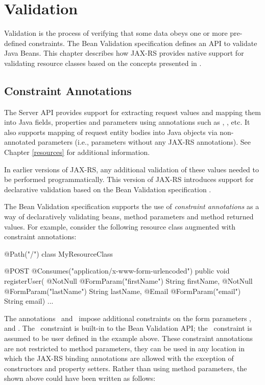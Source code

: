 \chapter{Validation}
\label{validation}

Validation is the process of verifying that some data obeys one or more pre-defined constraints. The Bean Validation specification \cite{bv11} defines an API to validate Java Beans. This chapter describes how JAX-RS provides native support for validating resource classes based on the concepts presented in \cite{bv11}.

\section{Constraint Annotations}
\label{constraint_annotations}

The Server API provides support for extracting request values and mapping them into Java fields, properties and parameters using annotations such as , , etc. It also supports mapping of request entity bodies into Java objects via non-annotated parameters (i.e., parameters without any JAX-RS annotations). See Chapter \ref{resources} for additional information.

In earlier versions of JAX-RS, any additional validation of these values needed to be performed programmatically. This version of JAX-RS introduces support for declarative validation based on the Bean Validation specification \cite{bv11}. 

The Bean Validation specification \cite{bv11} supports the use of \emph{constraint annotations} as a way of declaratively validating beans, method parameters and method returned values. For example, consider the following resource class augmented with constraint annotations:

\begin{listing}{1}
@Path("/")
class MyResourceClass {

  @POST
  @Consumes("application/x-www-form-urlencoded")
  public void registerUser(
    @NotNull @FormParam("firstName") String firstName,
    @NotNull @FormParam("lastName") String lastName,
    @Email @FormParam("email") String email) {
    ...
  }
}
\end{listing}

The annotations \NotNull\ and \Email\ impose additional constraints on the form parameters ,  and . The \NotNull\ constraint is built-in to the Bean Validation API; the \Email\ constraint is assumed to be user defined in the example above. These constraint annotations are not restricted to method parameters, they can be used in any location in which the JAX-RS binding annotations are allowed with the exception of constructors and property setters. Rather than using method parameters, the  shown above could have been written as follows:

